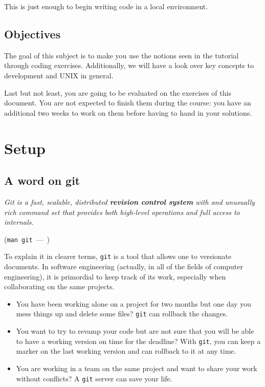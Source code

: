 \documentclass[12pt]{article}
\let\oldquote\quote
\let\endoldquote\endquote
\renewenvironment{quote}[2][]
  {\if\relax\detokenize{#1}\relax
     \def\quoteauthor{#2}%
   \else
     \def\quoteauthor{#2~---~#1}%
   \fi
   \oldquote}
  {\par\nobreak\smallskip\hfill(\quoteauthor)%
   \endoldquote\addvspace{\bigskipamount}}
\begin{document}
This is just enough to begin writing code in a local environment.

\subsection{Objectives}

The goal of this subject is to make you use the notions seen in the tutorial through coding exercises.
Additionally, we will have a look over key concepts to development and UNIX in general.

Last but not least, you are going to be evaluated on the exercises of this document. You are not expected to finish them during the course: you have an additional two weeks to work on them before having to hand in your solutions.

\section{Setup}
\subsection{A word on git}

\begin{quote}{\texttt{man git}}
\textit{Git is a fast, scalable, distributed \textbf{revision control system} with and unusually rich command set that provides both high-level operations and full access to internals.}
\end{quote}

To explain it in clearer terms, \texttt{git} is a tool that allows one to versionate documents. In software engineering (actually, in all of the fields of computer engineering), it is primordial to keep track of its work, especially when collaborating on the same projects.

\begin{itemize}
\item You have been working alone on a project for two months but one day you mess things up and delete some files? \texttt{git} can rollback the changes.
\item You want to try to revamp your code but are not sure that you will be able to have a working version on time for the deadline? With \texttt{git}, you can keep a marker on the last working version and can rollback to it at any time.
\item You are working in a team on the same project and want to share your work without conflicts? A \texttt{git} server can save your life.
\end{itemize}
\end{document}
